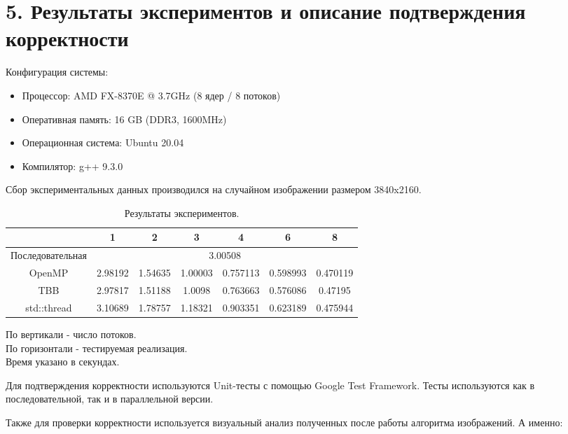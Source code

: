 \documentclass{report}
\begin{document}
    \section*{5. Результаты экспериментов и описание подтверждения корректности}
    \par Конфигурация системы:
    \begin{itemize}
        \item Процессор: AMD FX-8370E @ 3.7GHz (8 ядер / 8 потоков)
        \item Оперативная память: 16 GB (DDR3, 1600MHz)
        \item Операционная система: Ubuntu 20.04
        \item Компилятор: g++ 9.3.0
    \end{itemize}
    \par Сбор экспериментальных данных производился на случайном изображении размером 3840x2160.
    \begin{table}[htbp]
        \centering
        \begin{tabular}{|c|c|c|c|c|c|c|}
            \hline
                             & 1       & 2       & 3       & 4        & 6        & 8        \\ \hline
            Последовательная & \multicolumn{6}{c|}{3.00508}                                 \\ \hline
            OpenMP           & 2.98192 & 1.54635 & 1.00003 & 0.757113 & 0.598993 & 0.470119 \\ \hline
            TBB              & 2.97817 & 1.51188 & 1.0098  & 0.763663 & 0.576086 & 0.47195  \\ \hline
            std::thread      & 3.10689 & 1.78757 & 1.18321 & 0.903351 & 0.623189 & 0.475944 \\ \hline
        \end{tabular}
        \caption{Результаты экспериментов.}
        \label{tab:results}
        По вертикали - число потоков. \\
        По горизонтали - тестируемая реализация. \\
        Время указано в секундах.
    \end{table}
    \par Для подтверждения корректности используются Unit-тесты с помощью Google Test Framework. Тесты используются как в последовательной, так и в параллельной версии.
    \par Также для проверки корректности используется визуальный анализ полученных после работы алгоритма изображений. А именно:
\end{document}
